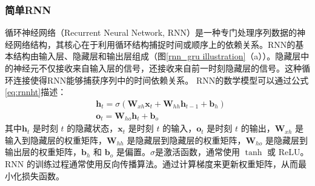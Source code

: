 \subsubsection{简单RNN}
循环神经网络（Recurrent Neural Network, RNN）是一种专门处理序列数据的神经网络结构，其核心在于利用循环结构捕捉时间或顺序上的依赖关系\cite{elmanFindingStructureTime1990}。RNN的基本结构由输入层、隐藏层和输出层组成（图\ref{rnn_gru illustration}（a））。隐藏层中的神经元不仅接收来自输入层的信号，还接收来自前一时刻隐藏层的信号。这种循环连接使得RNN能够捕获序列中的时间依赖关系。
RNN的数学模型可以通过公式\eqref{eq:rnnht}描述：
\begin{align}
   & \mathbf{h}_t = \sigma(\mathbf{W}_{xh} \mathbf{x}_t + \mathbf{W}_{hh} \mathbf{h}_{t-1} + \mathbf{b}_h) \label{eq:rnnht} \\
   & {\mathbf{o}_t = \mathbf{W}_{ho} \mathbf{h}_t + \mathbf{b}_o} \label{eq:rnnot}
\end{align}
其中$\mathbf{h}_t$ 是时刻 $t$ 的隐藏状态，$\mathbf{x}_t$ 是时刻 $t$ 的输入，$\mathbf{o}_t$ 是时刻 $t$ 的输出，$\mathbf{W}_{xh}$ 是输入到隐藏层的权重矩阵，$\mathbf{W}_{hh}$ 是隐藏层到隐藏层的权重矩阵，$\mathbf{W}_{ho}$ 是隐藏层到输出层的权重矩阵，$\mathbf{b}_h$ 和 $\mathbf{b}_o$ 是偏置。$\sigma$是激活函数，通常使用 $\tanh$ 或 $\text{ReLU}$。RNN 的训练过程通常使用反向传播算法。通过计算梯度来更新权重矩阵，从而最小化损失函数。

